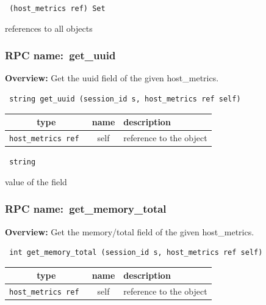 \vspace{0.3cm}

{\tt 
(host\_metrics ref) Set
}


references to all objects
\vspace{0.3cm}
\vspace{0.3cm}
\vspace{0.3cm}
\subsubsection{RPC name:~get\_uuid}

{\bf Overview:} 
Get the uuid field of the given host\_metrics.

\begin{verbatim} string get_uuid (session_id s, host_metrics ref self)\end{verbatim}



 
\vspace{0.3cm}
\begin{tabular}{|c|c|p{7cm}|}
 \hline
{\bf type} & {\bf name} & {\bf description} \\ \hline
{\tt host\_metrics ref } & self & reference to the object \\ \hline 

\end{tabular}

\vspace{0.3cm}

{\tt 
string
}


value of the field
\vspace{0.3cm}
\vspace{0.3cm}
\vspace{0.3cm}
\subsubsection{RPC name:~get\_memory\_total}

{\bf Overview:} 
Get the memory/total field of the given host\_metrics.

\begin{verbatim} int get_memory_total (session_id s, host_metrics ref self)\end{verbatim}



 
\vspace{0.3cm}
\begin{tabular}{|c|c|p{7cm}|}
 \hline
{\bf type} & {\bf name} & {\bf description} \\ \hline
{\tt host\_metrics ref } & self & reference to the object \\ \hline 

\end{tabular}

